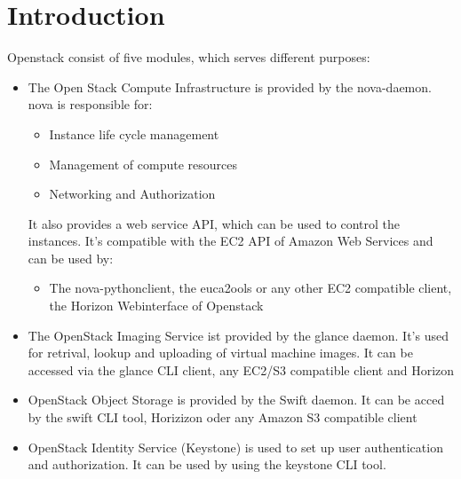 \documentclass[a4paper,ngerman,bibtotocliststotoc]{scrartcl}
\begin{document}
\begin{abstract}
This document describes how you use and administrate the openstack cloud
of the Distributed Systems Group at TU Braunschweig. It also describes
some basic concepts of openstack. \emph{Warning: It's not a replace of
the official documentation, use with caution!}
\end{abstract}
\section{Introduction}
\label{sec:introduction}
Openstack consist of five modules, which serves different purposes:
\begin{itemize}
\item The Open Stack Compute Infrastructure is provided by the
  nova-daemon. nova is responsible for:
  \begin{itemize}
  \item  Instance life cycle management
  \item Management of compute resources
  \item Networking and Authorization
  \end{itemize}
It also provides a web service API, which can be used to control the
instances. It's compatible with the EC2 API of Amazon Web Services and
can be used by:
\begin{itemize}
\item The nova-pythonclient, the euca2ools or any other EC2 compatible
  client, the Horizon Webinterface of Openstack
\end{itemize}
\item The OpenStack Imaging Service  ist provided by the glance
  daemon. It's used for retrival, lookup and uploading of virtual
  machine images. It can be accessed via the glance CLI client, any
  EC2/S3 compatible client and Horizon
\item OpenStack Object Storage is provided by the Swift daemon. It can
  be acced by the swift CLI tool, Horizizon oder any Amazon S3 compatible client
\item OpenStack Identity Service  (Keystone) is used to set up user
  authentication and authorization. It can be used by using the
  keystone CLI tool.
\end{itemize}
\end{document}
